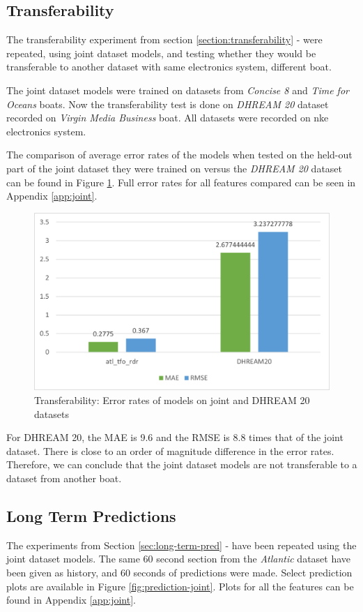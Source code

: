 \documentclass[12pt,twoside]{report}
\begin{document}
\subsection{Transferability}
The transferability experiment from section \ref{section:transferability} -  were repeated, using joint dataset models, and testing whether they would be transferable to another dataset with same electronics system, different boat.

The joint dataset models were trained on datasets from \textit{Concise 8} and \textit{Time for Oceans} boats. Now the transferability test is done on  \textit{DHREAM 20} dataset recorded on \textit{Virgin Media Business} boat. All datasets were recorded on nke electronics system.

The comparison of average error rates of the models when tested on the held-out part of the joint dataset they were trained on versus the \textit{DHREAM 20} dataset can be found in Figure \ref{fig:joint-transferability}. Full error rates for all features compared can be seen in Appendix \ref{app:joint}. 

\begin{figure}[htbp]
\centering
\includegraphics[width = 0.7\hsize]{figures/joint-models/joint-transferability.png}
\caption{Transferability: Error rates of models on joint and DHREAM 20 datasets}
\label{fig:joint-transferability}
\end{figure}

For DHREAM 20, the MAE is 9.6 and the RMSE is 8.8 times that of the joint dataset. There is close to an order of magnitude difference in the error rates. Therefore, we can conclude that the joint dataset models are not transferable to a dataset from another boat.

\subsection{Long Term Predictions}
The experiments from Section \ref{sec:long-term-pred} -  have been repeated using the joint dataset models.
The same 60 second section from the \textit{Atlantic} dataset have been given as history, and 60 seconds of predictions were made. Select prediction plots are available in Figure \ref{fig:prediction-joint}. Plots for all the features can be found in Appendix \ref{app:joint}.
\end{document}
